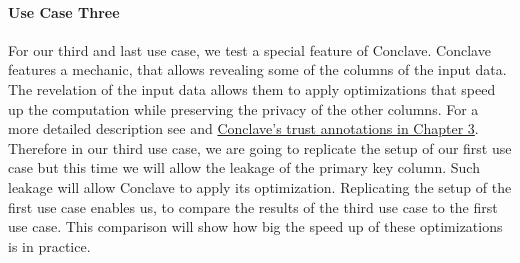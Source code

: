 \paragraph{Use Case Three}
For our third and last use case, we test a special feature of Conclave. Conclave features a mechanic, that allows revealing some of the columns of the input data. The revelation of the input data allows them to apply optimizations that speed up the computation while preserving the privacy of the other columns. For a more detailed description see and \hyperref[Trust_label]{Conclave's trust annotations in Chapter 3}. Therefore in our third use case, we are going to replicate the setup of our first use case but this time we will allow the leakage of the primary key column. Such leakage will allow Conclave to apply its optimization. Replicating the setup of the first use case enables us, to compare the results of the third use case to the first use case. This comparison will show how big the speed up of these optimizations is in practice. 
















